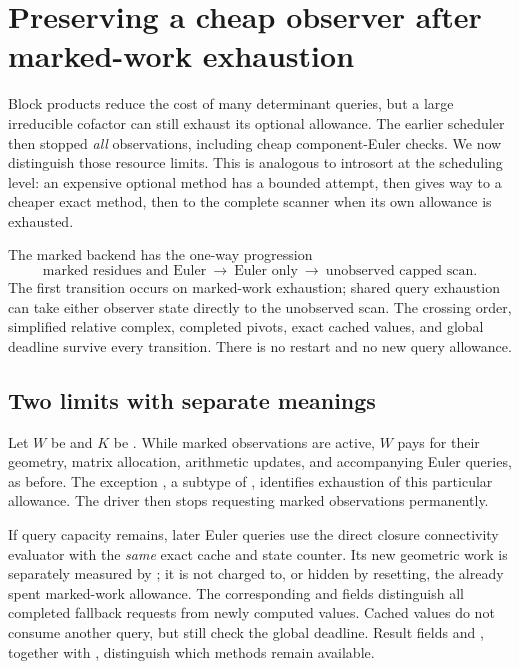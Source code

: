 \section{Preserving a cheap observer after marked-work exhaustion}
\label{sec:shadow-fallback}

Block products reduce the cost of many determinant queries, but a large
irreducible cofactor can still exhaust its optional allowance.  The earlier
scheduler then stopped \emph{all} observations, including cheap component-Euler
checks.  We now distinguish those resource limits.  This is analogous to introsort
at the scheduling level: an expensive optional method
has a bounded attempt, then gives way to a cheaper exact method, then to the
complete scanner when its own allowance is exhausted.

The marked backend has the one-way progression
\[
 \text{marked residues and Euler}
 \ \longrightarrow\ \text{Euler only}
 \ \longrightarrow\ \text{unobserved capped scan}.
\]
The first transition occurs on marked-work exhaustion; shared query
exhaustion can take either observer state directly to the unobserved scan.
The crossing order, simplified relative complex, completed pivots, exact
cached values, and global deadline survive every transition.  There is no
restart and no new query allowance.

\subsection{Two limits with separate meanings}

Let $W$ be  and $K$ be
.  While marked observations are active, $W$ pays
for their geometry, matrix allocation, arithmetic updates, and accompanying
Euler queries, as before.  The exception , a subtype
of , identifies exhaustion of this particular allowance.
The driver then stops requesting marked observations permanently.

If query capacity remains, later Euler queries use the direct closure
connectivity evaluator with the \emph{same} exact cache and state counter.
Its new geometric work is separately measured by
; it is not charged to, or hidden by
resetting, the already spent marked-work allowance.  The corresponding
 and 
fields distinguish all completed fallback requests from newly computed
values.  Cached values do not consume another query, but still check the
global deadline.  Result fields  and
, together with , distinguish
which methods remain available.

